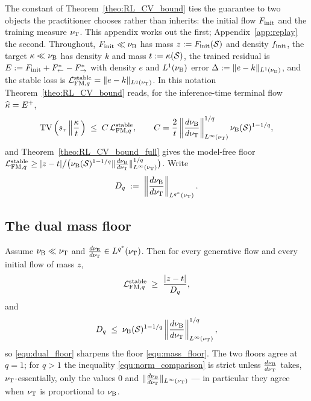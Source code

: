 \section{\appendixCtitle}\label{app:finit}

The constant of Theorem~\ref{theo:RL_CV_bound} ties the guarantee to two objects the
practitioner chooses rather than inherits: the initial flow $F_{\mathrm{init}}$ and the training
measure $\nu_{\mathrm{T}}$. This appendix works out the first; Appendix~\ref{app:replay} the
second. Throughout, $F_{\mathrm{init}}\ll\nu_{\mathrm{B}}$ has mass $z:=F_{\mathrm{init}}(\mathcal S)$ and density
$f_{\mathrm{init}}$, the target $\kappa\ll\nu_{\mathrm{B}}$ has density $k$ and mass
$t:=\kappa(\mathcal S)$, the trained residual is $E:=F_{\mathrm{init}}+F^*_{\leftarrow}-F^*_{\rightarrow}$ with
density $e$ and $L^1(\nu_{\mathrm{B}})$ error $\Delta:=\|e-k\|_{L^1(\nu_{\mathrm{B}})}$, and the stable loss is
$\mathcal L_{\mathrm{FM},q}^{\mathrm{stable}}=\|e-k\|_{L^q(\nu_{\mathrm{T}})}$. In this notation Theorem~\ref{theo:RL_CV_bound}
reads, for the inference-time terminal flow $\widehat{\kappa}=E^+$,
\begin{equation}\label{equ:paper_bound}
    \mathrm{TV}\left(s_\tau\left\|\frac{\kappa}{t}\right.\right)\;\leq\;C\,\mathcal L_{\mathrm{FM},q}^{\mathrm{stable}},\qquad
    C=\frac{2}{t}\left\|\frac{d\nu_{\mathrm{B}}}{d\nu_{\mathrm{T}}}\right\|^{1/q}_{L^\infty(\nu_{\mathrm{T}})}\nu_{\mathrm{B}}(\mathcal S)^{1-1/q},
\end{equation}
and Theorem~\ref{theo:RL_CV_bound_full} gives the model-free floor
$\mathcal L_{\mathrm{FM},q}^{\mathrm{stable}}\geq|z-t|\big/\bigl(\nu_{\mathrm{B}}(\mathcal S)^{1-1/q}\|\frac{d\nu_{\mathrm{B}}}{d\nu_{\mathrm{T}}}\|^{1/q}_{L^\infty(\nu_{\mathrm{T}})}\bigr)$.
Write
\begin{equation}\label{equ:dual_norm}
    D_{q} \;:=\; \left\|\frac{d\nu_{\mathrm{B}}}{d\nu_{\mathrm{T}}}\right\|_{L^{q^*}(\nu_{\mathrm{T}})} .
\end{equation}

\subsection{The dual mass floor}

\begin{proposition}\label{prop:dual_floor}
Assume $\nu_{\mathrm{B}}\ll\nu_{\mathrm{T}}$ and $\frac{d\nu_{\mathrm{B}}}{d\nu_{\mathrm{T}}}\in L^{q^*}(\nu_{\mathrm{T}})$. Then for every generative flow
and every initial flow of mass $z$,
\begin{equation}\label{equ:dual_floor}
    \mathcal L_{\mathrm{FM},q}^{\mathrm{stable}}\;\geq\;\frac{|z-t|}{D_{q}},
\end{equation}
and
\begin{equation}\label{equ:norm_comparison}
    D_{q}\;\leq\;\nu_{\mathrm{B}}(\mathcal S)^{1-1/q}\left\|\frac{d\nu_{\mathrm{B}}}{d\nu_{\mathrm{T}}}\right\|^{1/q}_{L^\infty(\nu_{\mathrm{T}})},
\end{equation}
so \eqref{equ:dual_floor} sharpens the floor \eqref{equ:mass_floor}. The two floors
agree at $q=1$; for $q>1$ the inequality \eqref{equ:norm_comparison} is strict unless
$\frac{d\nu_{\mathrm{B}}}{d\nu_{\mathrm{T}}}$ takes, $\nu_{\mathrm{T}}$-essentially, only the values $0$ and
$\|\frac{d\nu_{\mathrm{B}}}{d\nu_{\mathrm{T}}}\|_{L^\infty(\nu_{\mathrm{T}})}$ --- in particular they agree when $\nu_{\mathrm{T}}$ is
proportional to $\nu_{\mathrm{B}}$.
\end{proposition}

